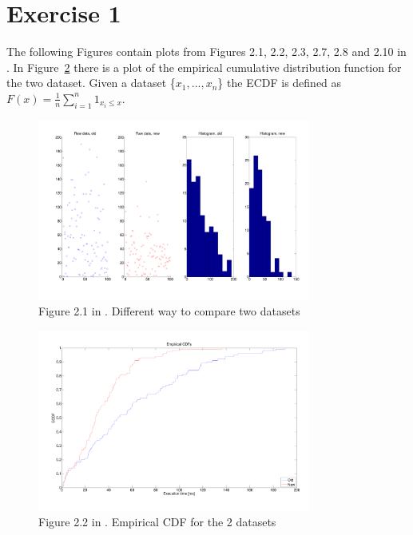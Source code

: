 \documentclass[10pt]{article}
\begin{document}
\section{Exercise 1}
The following Figures contain plots from Figures 2.1, 2.2, 2.3, 2.7, 2.8 and 2.10 in \cite{leb}. In Figure~\ref{fig:22} there is a plot of the empirical cumulative distribution function for the two dataset. Given a dataset \{$x_1, ... , x_n$\} the ECDF is defined as $F(x)=\frac{1}{n}\sum_{i=1}^n1_{x_i \le x}$.


\begin{figure}[h!]
  \centering
  \includegraphics[width=0.8\textwidth]{images/hw1_1_21.pdf}
  \caption{Figure 2.1 in \cite{leb}. Different way to compare two datasets}
  \label{fig:21}
\end{figure}


\begin{figure}[h!]
  \centering
  \includegraphics[width=0.8\textwidth]{images/hw1_1_22.pdf}
  \caption{Figure 2.2 in \cite{leb}. Empirical CDF for the 2 datasets}
  \label{fig:22}
\end{figure}
\end{document}
